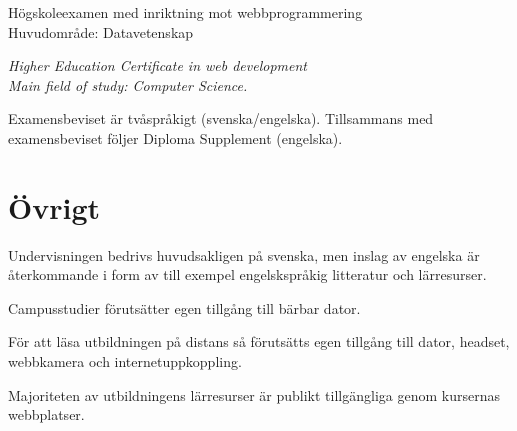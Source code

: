 \documentclass[swedish]{LnuCmThesis}
\begin{document}
Högskoleexamen med inriktning mot webbprogrammering\\
Huvudområde: Datavetenskap

\textit{Higher Education Certificate in web development\\
Main field of study: Computer Science.}

Examensbeviset är tvåspråkigt (svenska/engelska). Tillsammans med examensbeviset
följer Diploma Supplement (engelska).

\section*{Övrigt}

Undervisningen bedrivs huvudsakligen på svenska, men inslag av engelska är
återkommande i form av till exempel engelskspråkig litteratur och lärresurser.

Campusstudier förutsätter egen tillgång till bärbar dator.

För att läsa utbildningen på distans så förutsätts egen tillgång till dator, headset,
webbkamera och internetuppkoppling.

Majoriteten av utbildningens lärresurser är publikt tillgängliga genom kursernas
webbplatser.
\end{document}
